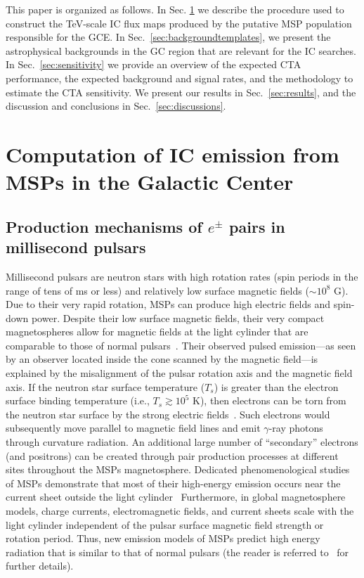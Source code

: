 \documentclass[doublespace,nopageskip]{VTthesis} %
\begin{document}
This paper is organized as follows. In Sec. \ref{sec:ICfromMSPs} we describe the procedure used to construct the TeV-scale IC flux maps produced by the putative MSP population responsible for the GCE. In Sec.~\ref{sec:backgroundtemplates}, we present the astrophysical backgrounds in the GC region that are relevant for the IC searches. In Sec.~\ref{sec:sensitivity} we provide an overview of the expected CTA performance, the expected background and signal rates, and the methodology to estimate the CTA sensitivity. We present our results in Sec.~\ref{sec:results}, and the discussion and conclusions in Sec.~\ref{sec:discussions}. 
 
 

\section{Computation of IC emission from MSPs in the Galactic Center}
\label{sec:ICfromMSPs}


\subsection{Production mechanisms of $e^{\pm}$ pairs in millisecond pulsars}
\label{subsec:e+-injection}

Millisecond pulsars are neutron stars with high rotation rates (spin periods in the range of tens of ms or less) and relatively low surface magnetic fields ($\sim 10^{8}$ G). Due to their very rapid rotation, MSPs can produce high  
electric fields and spin-down power. Despite their low surface magnetic fields, their very compact magnetospheres allow for 
magnetic fields at the light cylinder that are comparable to those of normal pulsars~\citep{Harding:2021yuv}. Their observed pulsed emission---as seen by an observer located inside the cone scanned by the magnetic field---is explained by the misalignment of the pulsar rotation axis and the magnetic field axis.  If the neutron star surface temperature ($T_s$) is greater than the electron surface binding temperature (i.e., $T_s\gtrsim 10^5$ K), then electrons can be torn from the neutron star surface by the strong electric fields~\citep{Michel:1991}. Such electrons would subsequently move parallel to magnetic field lines and emit $\gamma$-ray photons through curvature radiation. An additional large number of ``secondary'' electrons (and positrons) can be created through pair production processes at different sites throughout the MSPs magnetosphere. 
Dedicated phenomenological studies of MSPs demonstrate that most of their high-energy emission occurs near the current sheet outside the light cylinder~\citep{Fermi-LAT:4FGL,Harding:2021yuv}
Furthermore, in global magnetosphere models, charge currents, electromagnetic fields, and current sheets scale with the light cylinder independent of the pulsar surface magnetic field strength or rotation period. Thus, new emission models of MSPs predict high energy radiation that is similar to that of normal pulsars (the reader is referred to~\citealt{Harding:2021yuv} for further details).
\end{document}
